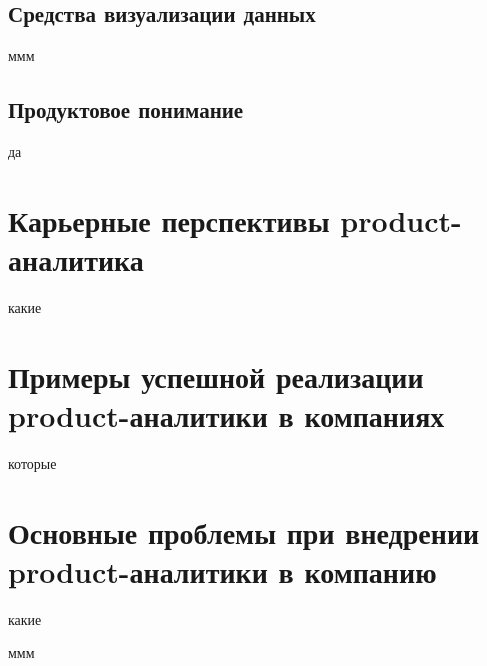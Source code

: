 \documentclass[referat, times]{SCWorks}
\begin{document}
\subsection{Средства визуализации данных}
ммм

\subsection{Продуктовое понимание}
да

\section{Карьерные перспективы product-аналитика}
какие

\section{Примеры успешной реализации product-аналитики в компаниях}
которые

\section{Основные проблемы при внедрении product-аналитики в компанию}
какие



\conclusion
ммм
\nocite{*}




\appendix
\end{document}
